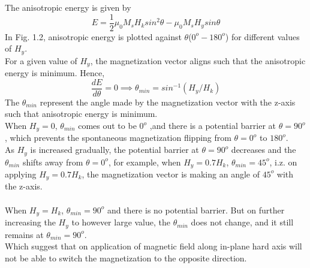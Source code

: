 \documentclass[12pt,a4paper,bold]{thesis}
\theoremstyle{thm}
\theoremstyle{definition}
\begin{document}
The anisotropic energy is given by 
\[E=\frac{1}{2}\mu_0M_sH_ksin^2\theta - \mu_0M_sH_ysin\theta\]
In Fig. 1.2, anisotropic energy is plotted against $\theta$($0^o - 180^o$) for different values of $H_y$.\\
For a given value of $H_y$, the magnetization vector aligns such that the anisotropic energy is minimum. Hence, \[\frac{dE}{d\theta}=0 \implies \theta_{min}=sin^{-1}(H_y/H_k)\]
The $\theta_{min}$ represent the angle made by the magnetization vector with the z-axis such that anisotropic energy is minimum. \\
When $H_y=0$, $\theta_{min}$ comes out to be $0^o$ ,and there is a potential barrier at $\theta=90^o$, which prevents the spontaneous magnetization flipping from $\theta=0^o$ to $180^o$. \\
As $H_y$ is increased gradually, the potential barrier at $\theta=90^o$ decreases and the $\theta_{min}$ shifts away from $\theta=0^o$, for example, when $H_y=0.7H_k$, $\theta_{min}=45^o$, i.z. on applying $H_y=0.7H_k$, the magnetization vector is making an angle of $45^o$ with the z-axis.\\\\
When $H_y=H_k$, $\theta_{min}=90^o$ and there is no potential barrier. But on further increasing the $H_y$ to however large value, the $\theta_{min}$ does not change, and it still remains at $\theta_{min}=90^o$.\\
Which suggest that on application of magnetic field along in-plane hard axis will not be able to switch the magnetization to the opposite direction.\\\\
\end{document}
